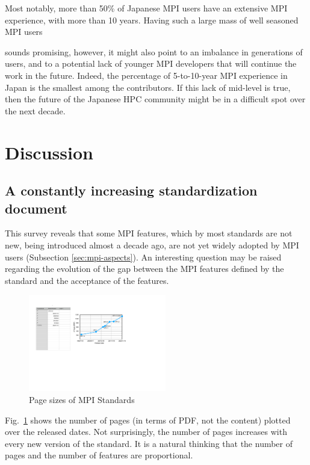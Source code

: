 \documentclass[preprint,5p,times]{elsarticle}
\newcommand{\revision}[2]{{\color{blue}#2}}
\def\countries{contributors\xspace{}}%
\begin{document}
Most notably, more than 50\% of Japanese MPI users have an extensive MPI
experience, with more than 10 years. Having such a large mass of well seasoned
MPI users {\revision{sound}{sounds} promising, however, it might also point to an imbalance in
generations of users, and to a potential lack of younger MPI developers that
will continue the work in the future.
Indeed, the percentage of 5-to-10-year MPI experience in Japan is the smallest
among the \countries. If this lack of mid-level is true, then the
future of \revision{}{the}
Japanese HPC community might be in a difficult spot over the next decade.

\section{Discussion}

\subsection{A constantly increasing standardization document}

This survey reveals that some MPI features, which by most standards are not new\revision{}{,}
being introduced almost a decade ago, are not yet widely \revision{accepted}{adopted} by MPI users
(Subsection \ref{sec:mpi-aspects}). An interesting question may be raised
regarding the evolution of the gap between the MPI features defined by the
standard and the acceptance of the features.

\begin{figure}[tb]
\begin{center}
\includegraphics[width=6cm]{Figs/MPI-Standards.pdf}
\caption{Page sizes of MPI Standards}
\label{fig:mpi-standards}
\end{center}
\end{figure}

Fig.~\ref{fig:mpi-standards} shows the number of pages (in terms of PDF, not the
content) plotted over the released dates. Not surprisingly, the number of pages
increases with every new version of the standard. It is a natural thinking that
the number of pages and the number of features are proportional.

}
\end{document}
